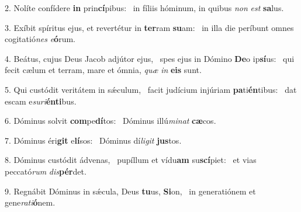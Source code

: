 2. Nolíte confídere \textbf{in} prin\textbf{cí}pibus: \ast\  in fíliis hóminum, in quibus \textit{non} \textit{est} \textbf{sa}lus.\

3. Exíbit spíritus ejus, et revertétur in \textbf{ter}ram \textbf{su}am: \ast\  in illa die períbunt omnes cogitatió\textit{nes} \textit{e}\textbf{ó}rum.\

4. Beátus, cujus Deus Jacob adjútor ejus, \dag\  spes ejus in Dómino \textbf{De}o ip\textbf{sí}us: \ast\  qui fecit cælum et terram, mare et ómnia, \textit{quæ} \textit{in} \textbf{e}\textbf{is} sunt.\

5. Qui custódit veritátem in sǽculum, \dag\  facit judícium injúriam \textbf{pa}ti\textbf{én}tibus: \ast\  dat escam e\textit{su}\textit{ri}\textbf{én}\textbf{ti}bus.\

6. Dóminus solvit \textbf{com}pe\textbf{dí}tos: \ast\  Dóminus illú\textit{mi}\textit{nat} \textbf{cæ}cos.\

7. Dóminus éri\textbf{git} e\textbf{lí}sos: \ast\  Dóminus dí\textit{li}\textit{git} \textbf{jus}tos.\

8. Dóminus custódit ádvenas, \dag\  pupíllum et vídu\textbf{am} su\textbf{scí}piet: \ast\  et vias peccató\textit{rum} \textit{dis}\textbf{pér}det.\

9. Regnábit Dóminus in sǽcula, Deus \textbf{tu}us, \textbf{Si}on, \ast\  in generatiónem et gene\textit{ra}\textit{ti}\textbf{ó}nem.\

